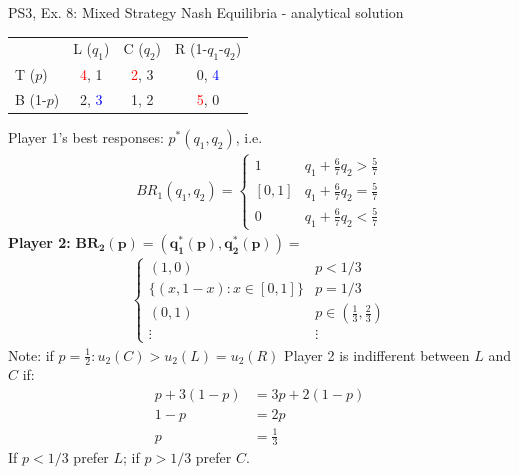 \begin{frame}{PS3, Ex. 8: Mixed Strategy Nash Equilibria - analytical solution}
  \begin{multicols}{2}
    \begin{table}
      \begin{tabular}{l|c|c|c|}
          \multicolumn{1}{c}{}  & \multicolumn{1}{c}{L ($q_1$)} & \multicolumn{1}{c}{C ($q_2$)} & \multicolumn{1}{c}{R (1-$q_1$-$q_2$)} \\\cline{2-4}
          T ($p$)   & \textcolor{red}{4}, 1 & \textcolor{red}{2}, 3 & 0, \textcolor{blue}{4} \\\cline{2-4}
          B (1-$p$) & 2, \textcolor{blue}{3} & 1, 2 & \textcolor{red}{5}, 0 \\\cline{2-4}
      \end{tabular}
    \end{table}
    Player 1's best responses: $p^{*}(q_1,q_2)$, i.e.
    \begin{align*}
      BR_1(q_1,q_2)=
      \left\{ \begin{array}{ll}
          1                 & q_1 + \frac{6}{7}q_2 > \frac{5}{7}\\
          \left[0,1\right]  & q_1 + \frac{6}{7}q_2 = \frac{5}{7}\\
          0                 & q_1 + \frac{6}{7}q_2 < \frac{5}{7}
      \end{array}\right.
    \end{align*}
    \textbf{Player 2:} $\bm{BR_2(p)=\left(q_1^{*}(p),q_2^{*}(p)\right)}=$
    \begin{align*}
      \left\{ \begin{array}{ll}
          (1,0)                 & p < 1/3 \\
          \{(x,1-x):x\in[0,1]\} & p = 1/3 \\
          (0,1)                 & p\in\left(\frac{1}{3},\frac{2}{3}\right)\\
          \vdots                & \vdots
      \end{array}\right.
    \end{align*}
    Note: if $p=\frac{1}{2}:u_2(C)>u_2(L)=u_2(R)$
  \vfill\null \columnbreak
    Player 2 is indifferent between $L$ and $C$ if:
    \begin{align*}
      p+3(1-p)&= 3p + 2(1-p) \\
      1-p     &= 2p \\
      p       &= \frac{1}{3}
    \end{align*}
    If $p<1/3$ prefer $L$; if $p>1/3$ prefer $C$.\\\medskip

\end{multicols}
\end{frame}
